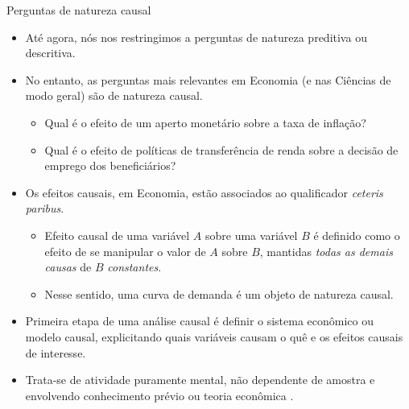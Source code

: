 \documentclass[11pt]{beamer}
\newenvironment{halfwideitemize}{\itemize\addtolength{\itemsep}{0.5em}}{\enditemize}
\begin{document}
\begin{frame}{Perguntas de natureza causal}
	\begin{itemize}
		\item Até agora, nós nos restringimos a perguntas de natureza preditiva ou descritiva.
		\item No entanto, as perguntas mais relevantes em Economia (e nas Ciências de modo geral) são de natureza causal.
		\begin{itemize}
			\item Qual é o efeito de um aperto monetário sobre a taxa de inflação?
			\item Qual é o efeito de políticas de transferência de renda sobre a decisão de emprego dos beneficiários?
		\end{itemize} 
		\item Os efeitos causais, em Economia, estão associados ao qualificador \textit{ceteris paribus}.
		\begin{itemize}
			\item Efeito causal de uma variável $A$ sobre uma variável $B$ é definido como o efeito de se manipular o valor de $A$ sobre $B$, mantidas \emph{todas as demais causas} de $B$ \emph{constantes}.
			\item Nesse sentido, uma curva de demanda é um objeto de natureza causal.
		\end{itemize}
	 \item Primeira etapa de uma análise causal é definir o sistema econômico ou modelo causal, explicitando quais variáveis causam o quê e os efeitos causais de interesse.
		\begin{halfwideitemize}
			\item Trata-se de {\color{blue}atividade puramente mental}, não dependente de amostra e envolvendo conhecimento prévio ou teoria econômica \citep{Heckman2022}.
		\end{halfwideitemize}
	\end{itemize}
\end{frame}
\end{document}
